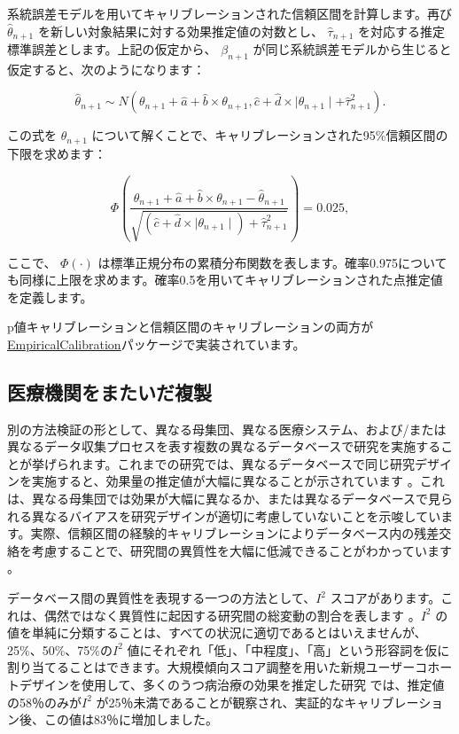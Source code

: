 \documentclass[
  11pt]{book}
\theoremstyle{definition}
\theoremstyle{definition}
\theoremstyle{definition}
\theoremstyle{definition}
\theoremstyle{remark}
\begin{document}
系統誤差モデルを用いてキャリブレーションされた信頼区間を計算します。再び \(\hat{\theta}_{n+1}\) を新しい対象結果に対する効果推定値の対数とし、 \(\hat{\tau}_{n+1}\) を対応する推定標準誤差とします。上記の仮定から、 \(\beta_{n+1}\) が同じ系統誤差モデルから生じると仮定すると、次のようになります：

\[\hat{\theta}_{n+1} \sim N(
\theta_{n+1} + \hat{a} + \hat{b} \times \theta_{n+1},
\hat{c} + \hat{d} \times \mid \theta_{n+1} \mid + \hat{\tau}_{n+1}^2) .\]

この式を \(\theta_{n+1}\) について解くことで、キャリブレーションされた95\%信頼区間の下限を求めます：

\[\Phi\left(
\frac{\theta_{n+1} + \hat{a} + \hat{b} \times \theta_{n+1}-\hat{\theta}_{n+1}}
{\sqrt{(\hat{c} + \hat{d} \times \mid \theta_{n+1} \mid) + \hat{\tau}_{n+1}^2}}
\right) = 0.025 ,\]

ここで、 \(\Phi(\cdot)\) は標準正規分布の累積分布関数を表します。確率0.975についても同様に上限を求めます。確率0.5を用いてキャリブレーションされた点推定値を定義します。

p値キャリブレーションと信頼区間のキャリブレーションの両方が\href{https://ohdsi.github.io/EmpiricalCalibration/}{EmpiricalCalibration}パッケージで実装されています。

\subsection{医療機関をまたいだ複製}\label{ux533bux7642ux6a5fux95a2ux3092ux307eux305fux3044ux3060ux8907ux88fd}


別の方法検証の形として、異なる母集団、異なる医療システム、および/または異なるデータ収集プロセスを表す複数の異なるデータベースで研究を実施することが挙げられます。これまでの研究では、異なるデータベースで同じ研究デザインを実施すると、効果量の推定値が大幅に異なることが示されています \citep{madigan_2013}。これは、異なる母集団では効果が大幅に異なるか、または異なるデータベースで見られる異なるバイアスを研究デザインが適切に考慮していないことを示唆しています。実際、信頼区間の経験的キャリブレーションによりデータベース内の残差交絡を考慮することで、研究間の異質性を大幅に低減できることがわかっています \citep{schuemie_2018}。

データベース間の異質性を表現する一つの方法として、\(I^2\) スコアがあります。これは、偶然ではなく異質性に起因する研究間の総変動の割合を表します \citep{higgins_2003}。\(I^2\) の値を単純に分類することは、すべての状況に適切であるとはいえませんが、25\%、50\%、75\%の\(I^2\) 値にそれぞれ「低」、「中程度」、「高」という形容詞を仮に割り当てることはできます。大規模傾向スコア調整を用いた新規ユーザーコホートデザインを使用して、多くのうつ病治療の効果を推定した研究 \citep{schuemie_2018b} では、推定値の58％のみが\(I^2\) が25％未満であることが観察され、実証的なキャリブレーション後、この値は83％に増加しました。
\end{document}
